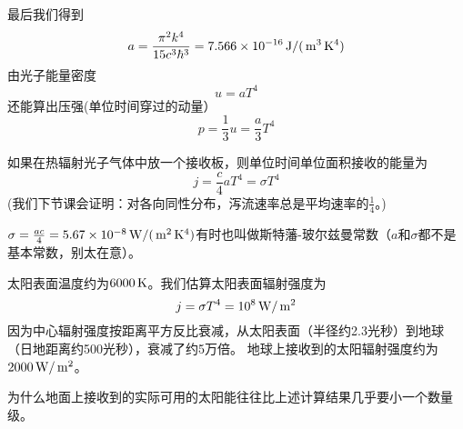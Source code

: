 \documentclass[CJK]{beamer}
\begin{document}
\begin{frame}
\bch
{\small 
最后我们得到
$$a = \frac{\pi^2 k^4}{15c^3\hbar^3} = 7.566 \times 10^{-16} \,\mathrm{J}/(\,\mathrm{m}^3\,\mathrm{K}^4) $$
由光子能量密度
$$u = a T^4$$
还能算出压强(单位时间穿过的动量）
$$p = \frac{1}{3}u = \frac{a}{3} T^4$$
}
\ech
\end{frame}


\begin{frame}
\bch
{\small 
如果在热辐射光子气体中放一个接收板，则单位时间单位面积接收的能量为
$$j = \frac{c}{4}aT^4 = \sigma T^4 $$
{\scriptsize (我们下节课会证明：对各向同性分布，泻流速率总是平均速率的$\frac{1}{4}$。)}

$\sigma = \frac{ac}{4} = 5.67 \times 10^{-8} \,\mathrm{W}/(\,\mathrm{m}^2 \,\mathrm{K}^4)$有时也叫做斯特藩-玻尔兹曼常数（$a$和$\sigma$都不是基本常数，别太在意）。
}
\ech
\end{frame}

\begin{frame}
\bch

太阳表面温度约为$6000\,\mathrm{K}$。我们估算太阳表面辐射强度为
$$j = \sigma T^4 = 10^8 \,\mathrm{W}/\,\mathrm{m}^2 $$
因为中心辐射强度按距离平方反比衰减，从太阳表面（半径约2.3光秒）到地球（日地距离约500光秒），衰减了约5万倍。
地球上接收到的太阳辐射强度约为$2000\,\mathrm{W}/\,\mathrm{m}^2$。



\ech
\end{frame}

\begin{frame}
\bch


为什么地面上接收到的实际可用的太阳能往往比上述计算结果几乎要小一个数量级。

\ech
\end{frame}
\end{document}
